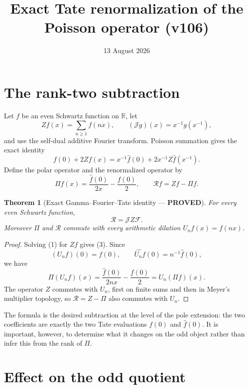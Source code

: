 \documentclass[11pt]{article}
\title{Exact Tate renormalization of the Poisson operator (v106)}
\date{13 August 2026}
\newcommand{\PROVED}{\textcolor{green!40!black}{\textbf{PROVED}}}
\newtheorem{theorem}{Theorem}
\begin{document}
\maketitle

\section{The rank-two subtraction}

Let $f$ be an even Schwartz function on $\mathbb R$, let
\[
 Zf(x)=\sum_{n\geq1}f(nx),\qquad
 (\mathscr Jg)(x)=x^{-1}g(x^{-1}),
\]
and use the self-dual additive Fourier transform.  Poisson summation gives
the exact identity
\begin{equation}
 f(0)+2Zf(x)=x^{-1}\widehat f(0)
                 +2x^{-1}Z\widehat f(x^{-1}).                 \tag{1}
\end{equation}
Define the polar operator and the renormalized operator by
\begin{equation}
 \Pi f(x)=\frac{\widehat f(0)}{2x}-\frac{f(0)}2,
 \qquad \mathcal Rf=Zf-\Pi f.                                \tag{2}
\end{equation}

\begin{theorem}[Exact Gamma--Fourier--Tate identity --- \PROVED]
For every even Schwartz function,
\begin{equation}
                 \boxed{\mathcal R=\mathscr JZ\mathcal F}.   \tag{3}
\end{equation}
Moreover $\Pi$ and $\mathcal R$ commute with every arithmetic dilation
$U_nf(x)=f(nx)$.
\end{theorem}

\begin{proof}
Solving (1) for $Zf$ gives (3).  Since
\[
 (U_nf)(0)=f(0),\qquad \widehat{U_nf}(0)=n^{-1}\widehat f(0),
\]
we have
\[
 \Pi(U_nf)(x)=\frac{\widehat f(0)}{2nx}-\frac{f(0)}2
             =U_n(\Pi f)(x).
\]
The operator $Z$ commutes with $U_n$, first on finite sums and then in
Meyer's multiplier topology, so $\mathcal R=Z-\Pi$ also commutes with
$U_n$.
\end{proof}

The formula is the desired subtraction at the level of the pole extension:
the two coefficients are exactly the two Tate evaluations $f(0)$ and
$\widehat f(0)$.  It is important, however, to determine what it changes
on the odd object rather than infer this from the rank of $\Pi$.

\section{Effect on the odd quotient}
\end{document}
